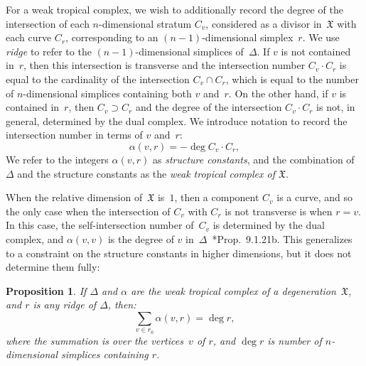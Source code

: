 \documentclass[11pt,reqno]{amsart}
\newtheorem{prop}[thm]{Proposition}
\theoremstyle{definition}
\newcommand{\defi}[1]{\emph{#1}}
\newcommand{\X}{\mathfrak X}
\begin{document}
For a weak tropical complex, we wish to additionally record the degree of the
intersection of each $n$-dimensional stratum $C_v$, considered as a divisor
in~$\X$ with each curve $C_r$, corresponding to an $(n-1)$-dimensional
simplex~$r$. We use \defi{ridge} to refer to the
$(n-1)$-dimensional simplices of~$\Delta$. If $v$ is
not contained in~$r$, then this
intersection is transverse and the intersection number $C_v \cdot C_r$ is equal
to the cardinality of the intersection $C_v \cap C_r$, which is equal
to the number of $n$-dimensional simplices containing both $v$ and~$r$. On the
other hand, if $v$ is contained in~$r$, then $C_v \supset C_r$ and the degree of
the intersection $C_v \cdot
C_r$ is not, in general, determined by the dual complex. We introduce
notation to record the intersection number in terms of $v$ and~$r$:
\begin{equation*}
\alpha(v,r) = - \deg C_v \cdot C_r,
\end{equation*}
We refer to the integers $\alpha(v, r)$ as \defi{structure constants}, and the
combination of $\Delta$ and the structure constants as the \defi{weak tropical
complex of $\X$}.

When the relative dimension of~$\X$ is~$1$, then a component $C_v$ is a
curve, and so the only case when the intersection of $C_v$ with $C_r$ is not
transverse is when $r = v$. In this case, the self-intersection number of~$C_v$
is determined by the dual complex, and $\alpha(v, v)$ is the degree of $v$
in~$\Delta$~\cite{liu}*{Prop.~9.1.21b}. This generalizes to a constraint on the
structure constants in higher dimensions, but it does not determine them fully:

\begin{prop}\label{p:constraint}
If $\Delta$ and $\alpha$ are the weak tropical complex of a degeneration~$\X$,
and $r$ is any ridge of $\Delta$,
then:
\begin{equation}\label{eq:constraint-in-motivation}
\sum_{v \in r_0} \alpha(v, r) = \deg r,
\end{equation}
where the summation is over the vertices~$v$ of $r$, and $\deg r$ is number of
$n$-dimensional simplices containing $r$.
\end{prop}
\end{document}
